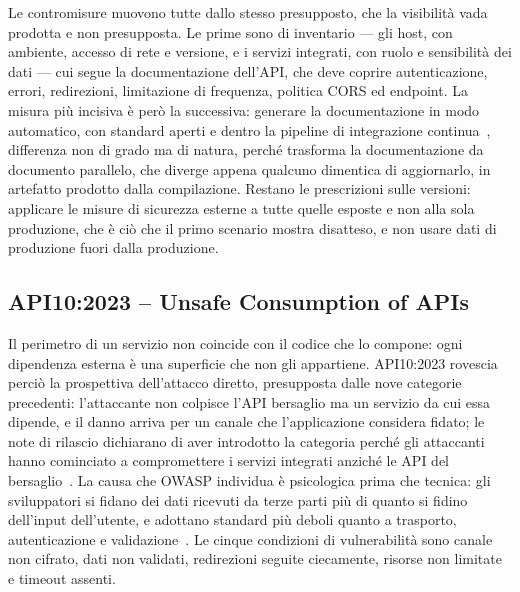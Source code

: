 Le contromisure muovono tutte dallo stesso presupposto, che la visibilità vada
prodotta e non presupposta. Le prime sono di inventario --- gli host, con
ambiente, accesso di rete e versione, e i servizi integrati, con ruolo e
sensibilità dei dati --- cui segue la documentazione dell'API, che deve coprire
autenticazione, errori, redirezioni, limitazione di frequenza, politica CORS ed
endpoint. La misura più incisiva è però la successiva: generare la
documentazione in modo automatico, con standard aperti e dentro la pipeline di
integrazione continua~\cite{owasp2023api9}, differenza non di grado ma di
natura, perché trasforma la documentazione da documento parallelo, che diverge
appena qualcuno dimentica di aggiornarlo, in artefatto prodotto dalla
compilazione. Restano le prescrizioni sulle versioni: applicare le misure di
sicurezza esterne a tutte quelle esposte e non alla sola produzione, che è ciò
che il primo scenario mostra disatteso, e non usare dati di produzione fuori
dalla produzione.

\subsection{API10:2023 -- Unsafe Consumption of APIs}
\label{subsubsec:api10}

Il perimetro di un servizio non coincide con il codice che lo compone: ogni
dipendenza esterna è una superficie che non gli appartiene. API10:2023
rovescia perciò la prospettiva
dell'attacco diretto, presupposta dalle nove categorie precedenti:
l'attaccante non colpisce l'API bersaglio ma un servizio da cui essa dipende,
e il danno arriva per un
canale che l'applicazione considera fidato; le note di rilascio dichiarano di
aver introdotto la categoria perché gli attaccanti hanno cominciato a
compromettere i servizi integrati anziché le API del
bersaglio~\cite{owasp2023apireleasenotes}. La causa che OWASP individua è
psicologica prima che tecnica: gli sviluppatori si fidano dei dati ricevuti da
terze parti più di quanto si fidino dell'input dell'utente, e adottano standard
più deboli quanto a trasporto, autenticazione e
validazione~\cite{owasp2023api10}. Le cinque condizioni di vulnerabilità sono
canale non cifrato, dati non validati, redirezioni seguite ciecamente, risorse
non limitate e timeout assenti.

